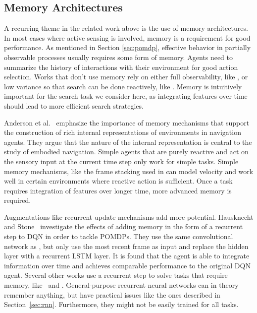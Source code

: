 
\subsection{Memory Architectures}

A recurring theme in the related work above is the use of memory architectures.
In most cases where active sensing is involved, memory is a requirement for good performance.
As mentioned in Section \ref{sec:pomdp}, effective behavior in partially observable processes usually requires some form of memory.
Agents need to summarize the history of interactions with their environment for good action selection.
Works that don't use memory rely on either full observability, like \cite{caicedo_active_2015}, or low variance so that search can be done reactively, like \cite{ourselin_artificial_2016}.
Memory is intuitively important for the search task we consider here, as integrating features over time should lead to more efficient search strategies.

Anderson et al.~\cite{anderson_evaluation_2018} emphasize the importance of memory mechanisms that support the construction of rich internal representations of environments in navigation agents.
They argue that the nature of the internal representation is central to the study of embodied navigation.
Simple agents that are purely reactive and act on the sensory input at the current time step only work for simple tasks.
Simple memory mechanisms, like the frame stacking used in \cite{mnih_human-level_2015} can model velocity and work well in certain environments where reactive action is sufficient.
Once a task requires integration of features over longer time, more advanced memory is required.

Augmentations like recurrent update mechanisms add more potential.
Hausknecht and Stone~\cite{hausknecht_deep_2017} investigate the effects of adding memory in the form of a recurrent step to DQN in order to tackle POMDPs.
They use the same convolutional network as \cite{mnih_human-level_2015}, but only use the most recent frame as input and replace the hidden layer with a recurrent LSTM layer.
It is found that the agent is able to integrate information over time and achieves comparable performance to the original DQN agent.
Several other works use a recurrent step to solve tasks that require memory, like~\cite{mnih_recurrent_2014} and \cite{mnih_asynchronous_2016}.
General-purpose recurrent neural networks can in theory remember anything, but have practical issues like the ones described in Section~\ref{sec:rnn}.
Furthermore, they might not be easily trained for all tasks.

